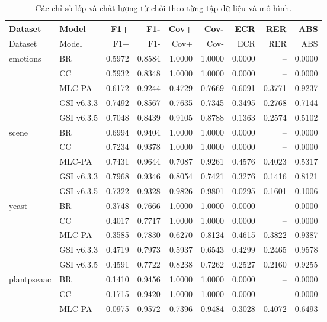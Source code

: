 \documentclass[11pt,a4paper,twoside]{article}
\begin{document}
\begin{landscape}
\begin{longtable}{llrrrrrrr}
\caption{Các chỉ số lớp và chất lượng từ chối theo từng tập dữ liệu và mô hình.}\label{tab:appendix-3}\\
\toprule
Dataset & Model & F1+ & F1- & Cov+ & Cov- & ECR & RER & ABS \\
\midrule
\endfirsthead
\toprule
Dataset & Model & F1+ & F1- & Cov+ & Cov- & ECR & RER & ABS \\
\midrule
\endhead
emotions & BR & 0.5972 & 0.8584 & 1.0000 & 1.0000 & 0.0000 & -- & 0.0000 \\
 & CC & 0.5932 & 0.8348 & 1.0000 & 1.0000 & 0.0000 & -- & 0.0000 \\
 & MLC-PA & 0.6172 & 0.9244 & 0.4729 & 0.7669 & 0.6091 & 0.3771 & 0.9237 \\
 & GSI v6.3.3 & 0.7492 & 0.8567 & 0.7635 & 0.7345 & 0.3495 & 0.2768 & 0.7144 \\
 & GSI v6.3.5 & 0.7048 & 0.8439 & 0.9105 & 0.8788 & 0.1363 & 0.2574 & 0.5102 \\
\addlinespace[2pt]
scene & BR & 0.6994 & 0.9404 & 1.0000 & 1.0000 & 0.0000 & -- & 0.0000 \\
 & CC & 0.7234 & 0.9378 & 1.0000 & 1.0000 & 0.0000 & -- & 0.0000 \\
 & MLC-PA & 0.7431 & 0.9644 & 0.7087 & 0.9261 & 0.4576 & 0.4023 & 0.5317 \\
 & GSI v6.3.3 & 0.7968 & 0.9346 & 0.8054 & 0.7421 & 0.3276 & 0.1416 & 0.8121 \\
 & GSI v6.3.5 & 0.7322 & 0.9328 & 0.9826 & 0.9801 & 0.0295 & 0.1601 & 0.1006 \\
\addlinespace[2pt]
yeast & BR & 0.3748 & 0.7666 & 1.0000 & 1.0000 & 0.0000 & -- & 0.0000 \\
 & CC & 0.4017 & 0.7717 & 1.0000 & 1.0000 & 0.0000 & -- & 0.0000 \\
 & MLC-PA & 0.3585 & 0.7830 & 0.6270 & 0.8124 & 0.4615 & 0.3822 & 0.9387 \\
 & GSI v6.3.3 & 0.4719 & 0.7973 & 0.5937 & 0.6543 & 0.4299 & 0.2465 & 0.9578 \\
 & GSI v6.3.5 & 0.4591 & 0.7722 & 0.8238 & 0.7262 & 0.2527 & 0.2160 & 0.9255 \\
\addlinespace[2pt]
plantpseaac & BR & 0.1410 & 0.9456 & 1.0000 & 1.0000 & 0.0000 & -- & 0.0000 \\
 & CC & 0.1715 & 0.9420 & 1.0000 & 1.0000 & 0.0000 & -- & 0.0000 \\
 & MLC-PA & 0.0975 & 0.9572 & 0.7396 & 0.9484 & 0.3028 & 0.4072 & 0.6493 \\

\end{longtable}
\end{landscape}
\end{document}
